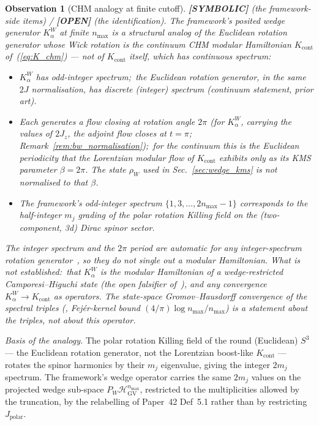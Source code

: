 \documentclass[11pt,a4paper]{article}
\theoremstyle{plain}
\newtheorem{observation}[theorem]{Observation}
\theoremstyle{definition}
\newcommand{\nmax}{n_{\max}}
\newcommand{\sthree}{S^{3}}
\newcommand{\Hilb}{\mathcal{H}}
\newcommand{\Kalpha}{K_{\alpha}^{W}}
\newcommand{\rhoW}{\rho_{W}}
\newcommand{\Wedge}{W}
\begin{document}
\begin{observation}[CHM analogy at finite cutoff]
\label{thm:chm_identification}
\textbf{[SYMBOLIC]} (the framework-side items) / \textbf{[OPEN]} (the
identification). The framework's posited wedge generator $\Kalpha$ at
finite $\nmax$ is a structural analog of the \emph{Euclidean} rotation
generator whose Wick rotation is the continuum CHM modular Hamiltonian
$K_{\mathrm{cont}}$ of~(\ref{eq:K_chm}) --- not of $K_{\mathrm{cont}}$
itself, which has continuous spectrum:

\begin{itemize}
\item $\Kalpha$ has odd-integer spectrum;\ the Euclidean rotation
generator, in the same $2J$ normalisation, has discrete (integer)
spectrum (continuum statement, prior art).
\item Each generates a flow closing at rotation angle $2\pi$ (for
$\Kalpha$, carrying the values of $2J_{z}$, the adjoint flow closes at $t = \pi$;
Remark~\ref{rem:bw_normalisation});\ for the continuum this
is the Euclidean periodicity that the Lorentzian modular flow of
$K_{\mathrm{cont}}$ exhibits only as its KMS parameter
$\beta = 2\pi$. The state $\rhoW$ used in Sec.~\ref{sec:wedge_kms} is
not normalised to that $\beta$.
\item The framework's odd-integer spectrum $\{1, 3, \dots, 2\nmax - 1\}$
corresponds to the half-integer $m_j$ grading of the polar rotation
Killing field on the (two-component, 3d) Dirac spinor sector.
\end{itemize}
The integer spectrum and the $2\pi$ period are automatic for any
integer-spectrum rotation generator~\cite{paper42}, so they do not
single out a modular Hamiltonian. What is \emph{not} established:\ that
$\Kalpha$ is the modular Hamiltonian of a wedge-restricted
Camporesi--Higuchi state (the open falsifier of~\cite{paper42}), and
any convergence $\Kalpha \to K_{\mathrm{cont}}$ as operators. The
state-space Gromov--Hausdorff convergence of the spectral triples
(\cite{paper38}, Fej\'er-kernel bound $(4/\pi)\log\nmax/\nmax$) is a statement about
the triples, not about this operator.
\end{observation}

\noindent\emph{Basis of the analogy.}
The polar rotation Killing field of the round (Euclidean) $\sthree$ ---
the Euclidean rotation generator, not the Lorentzian boost-like
$K_{\mathrm{cont}}$ --- rotates the spinor harmonics by their $m_{j}$ eigenvalue, giving the integer
$2 m_{j}$ spectrum. The framework's wedge operator carries the same
$2 m_{j}$ values on the projected wedge sub-space $P_{\Wedge}
\Hilb_{\mathrm{GV}}^{\nmax}$, restricted to the multiplicities allowed by
the truncation, by the relabelling of Paper~42 Def~5.1 rather than by
restricting $J_{\mathrm{polar}}$.
\end{document}
